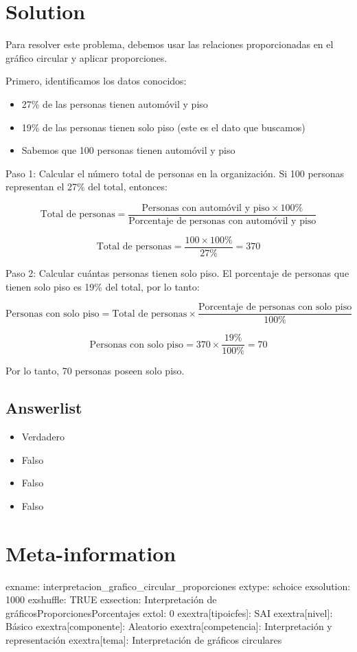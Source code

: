 \documentclass[
]{article}
\providecommand{\tightlist}{%
  \setlength{\itemsep}{0pt}\setlength{\parskip}{0pt}}
\begin{document}
\section{Solution}\label{solution}

Para resolver este problema, debemos usar las relaciones proporcionadas
en el gráfico circular y aplicar proporciones.

Primero, identificamos los datos conocidos:

\begin{itemize}
\tightlist
\item
  27\% de las personas tienen automóvil y piso
\item
  19\% de las personas tienen solo piso (este es el dato que buscamos)
\item
  Sabemos que 100 personas tienen automóvil y piso
\end{itemize}

Paso 1: Calcular el número total de personas en la organización. Si 100
personas representan el 27\% del total, entonces:

\[\text{Total de personas} = \frac{\text{Personas con automóvil y piso} \times 100\%}{\text{Porcentaje de personas con automóvil y piso}}\]

\[\text{Total de personas} = \frac{100 \times 100\%}{27\%} = 370\]

Paso 2: Calcular cuántas personas tienen solo piso. El porcentaje de
personas que tienen solo piso es 19\% del total, por lo tanto:

\[\text{Personas con solo piso} = \text{Total de personas} \times \frac{\text{Porcentaje de personas con solo piso}}{100\%}\]

\[\text{Personas con solo piso} = 370 \times \frac{19\%}{100\%} = 70\]

Por lo tanto, 70 personas poseen solo piso.

\subsection{Answerlist}\label{answerlist-1}

\begin{itemize}
\tightlist
\item
  Verdadero
\item
  Falso
\item
  Falso
\item
  Falso
\end{itemize}

\section{Meta-information}\label{meta-information}

exname: interpretacion\_grafico\_circular\_proporciones extype: schoice
exsolution: 1000 exshuffle: TRUE exsection: Interpretación de
gráficos\textbar Proporciones\textbar Porcentajes extol: 0
exextra{[}tipoicfes{]}: SAI exextra{[}nivel{]}: Básico
exextra{[}componente{]}: Aleatorio exextra{[}competencia{]}:
Interpretación y representación exextra{[}tema{]}: Interpretación de
gráficos circulares
\end{document}
